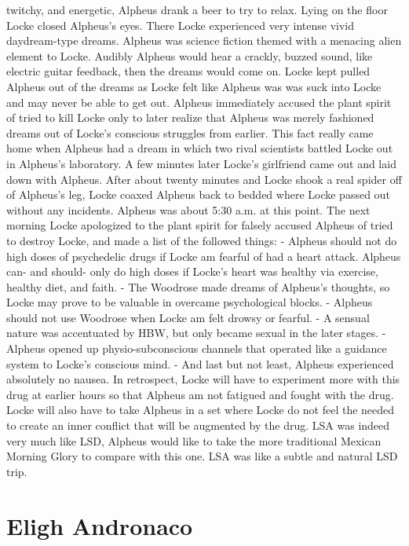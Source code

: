 \documentclass[12pt]{book}
\begin{document}
twitchy, and energetic, Alpheus drank a beer to try to relax. Lying on the floor Locke closed Alpheus's eyes. There Locke experienced very intense vivid daydream-type dreams. Alpheus was science fiction themed with a menacing alien element to Locke. Audibly Alpheus would hear a crackly, buzzed sound, like electric guitar feedback, then the dreams would come on. Locke kept pulled Alpheus out of the dreams as Locke felt like Alpheus was was suck into Locke and may never be able to get out. Alpheus immediately accused the plant spirit of tried to kill Locke only to later realize that Alpheus was merely fashioned dreams out of Locke's conscious struggles from earlier. This fact really came home when Alpheus had a dream in which two rival scientists battled Locke out in Alpheus's laboratory. A few minutes later Locke's girlfriend came out and laid down with Alpheus. After about twenty minutes and Locke shook a real spider off of Alpheus's leg, Locke coaxed Alpheus back to bedded where Locke passed out without any incidents. Alpheus was about 5:30 a.m. at this point. The next morning Locke apologized to the plant spirit for falsely accused Alpheus of tried to destroy Locke, and made a list of the followed things: - Alpheus should not do high doses of psychedelic drugs if Locke am fearful of had a heart attack. Alpheus can- and should- only do high doses if Locke's heart was healthy via exercise, healthy diet, and faith. - The Woodrose made dreams of Alpheus's thoughts, so Locke may prove to be valuable in overcame psychological blocks. - Alpheus should not use Woodrose when Locke am felt drowsy or fearful. - A sensual nature was accentuated by HBW, but only became sexual in the later stages. - Alpheus opened up physio-subconscious channels that operated like a guidance system to Locke's conscious mind. - And last but not least, Alpheus experienced absolutely no nausea. In retrospect, Locke will have to experiment more with this drug at earlier hours so that Alpheus am not fatigued and fought with the drug. Locke will also have to take Alpheus in a set where Locke do not feel the needed to create an inner conflict that will be augmented by the drug. LSA was indeed very much like LSD, Alpheus would like to take the more traditional Mexican Morning Glory to compare with this one. LSA was like a subtle and natural LSD trip.






\chapter{Eligh Andronaco}
\end{document}
